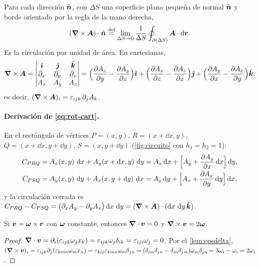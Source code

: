 \begin{definicion}[Rotacional]
\label{def:rot}
Para cada dirección $\hat{\bm{n}}$, con $\Delta S$ una superficie plana pequeña de
normal $\hat{\bm{n}}$ y borde orientado por la regla de la mano derecha,
\begin{equation}
  (\bm{\nabla}\times\bm{A})\cdot\hat{\bm{n}}\stackrel{\text{def}}{=}\lim_{\Delta S\to0}\frac{1}{\Delta S}\oint_{\partial(\Delta S)}\bm{A}\cdot\mathop{}\!\mathrm{d}\bm{r} .
  \label{eq:rot-def}
\end{equation}
Es la circulación por unidad de área. En cartesianas,
\begin{equation}
  \bm{\nabla}\times\bm{A}=\begin{vmatrix}\hat{\bm{\imath}}&\hat{\bm{\jmath}}&\hat{\bm{k}}\\ \partial_{x}&\partial_{y}&\partial_{z}\\ A_{x}&A_{y}&A_{z}\end{vmatrix}
  =\Bigl(\frac{\partial A_{z}}{\partial y}-\frac{\partial A_{y}}{\partial z}\Bigr)\hat{\bm{\imath}}+\Bigl(\frac{\partial A_{x}}{\partial z}-\frac{\partial A_{z}}{\partial x}\Bigr)\hat{\bm{\jmath}}
  +\Bigl(\frac{\partial A_{y}}{\partial x}-\frac{\partial A_{x}}{\partial y}\Bigr)\hat{\bm{k}} ,
  \label{eq:rot-cart}
\end{equation}
es decir, $(\bm{\nabla}\times\bm{A})_{i}=\varepsilon_{ijk}\,\partial_{j}A_{k}$.
\end{definicion}

\paragraph{Derivación de \eqref{eq:rot-cart}.} En el rectángulo de vértices
$P=(x,y)$, $R=(x+\dd x,y)$, $Q=(x+\dd x,y+\dd y)$, $S=(x,y+\dd y)$
(\cref{fig:circuito} con $h_{1}=h_{2}=1$):
\begin{align*}
  C_{PRQ}&=A_{x}(x,y)\,\dd x+A_{y}(x+\dd x,y)\,\dd y
  =A_{x}\dd x+\Bigl[A_{y}+\pd{A_{y}}{x}\dd x\Bigr]\dd y,\\
  C_{PSQ}&=A_{y}(x,y)\,\dd y+A_{x}(x,y+\dd y)\,\dd x
  =A_{y}\dd y+\Bigl[A_{x}+\pd{A_{x}}{y}\dd y\Bigr]\dd x,
\end{align*}
y la circulación cerrada es
$C_{PRQ}-C_{PSQ}=\bigl(\partial_{x}A_{y}-\partial_{y}A_{x}\bigr)\mathop{}\!\mathrm{d} x\,\mathop{}\!\mathrm{d} y
=(\bm{\nabla}\times\bm{A})\cdot(\mathop{}\!\mathrm{d} x\,\mathop{}\!\mathrm{d} y\,\hat{\bm{k}})$.

\begin{proposicion}
\label{prop:rigida}
Si $\bm{v}=\bm{\omega}\times\bm{r}$ con $\bm{\omega}$ constante, entonces
$\bm{\nabla}\cdot\bm{v}=0$ y $\bm{\nabla}\times\bm{v}=2\bm{\omega}$.
\end{proposicion}

\begin{proof}
$\bm{\nabla}\cdot\bm{v}=\partial_{i}(\varepsilon_{ijk}\omega_{j}x_{k})=\varepsilon_{ijk}\omega_{j}\delta_{ik}=\varepsilon_{iji}\omega_{j}=0$.
Por el \cref{lem:epsdelta},
$(\bm{\nabla}\times\bm{v})_{i}=\varepsilon_{ijk}\partial_{j}(\varepsilon_{kmn}\omega_{m}x_{n})
=\varepsilon_{kij}\varepsilon_{kmn}\omega_{m}\delta_{jn}
=(\delta_{im}\delta_{jn}-\delta_{in}\delta_{jm})\omega_{m}\delta_{jn}
=3\omega_{i}-\omega_{i}=2\omega_{i}$.
\end{proof}

